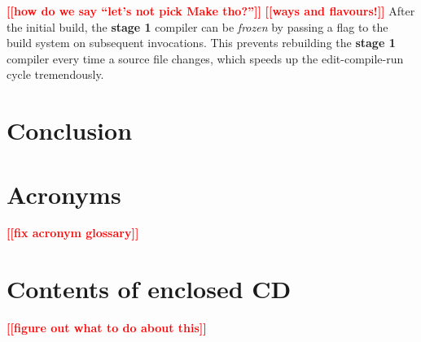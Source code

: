 \documentclass[thesis=B,english]{FITthesis}[2019/12/23]
\newcommand{\todo}[1]{\textcolor{red}{\textbf{[[#1]]}}}
\newcommand{\blind}[1][1]{\textcolor{gray}{\Blindtext[#1][1]}}
\begin{document}
\todo{how do we say ``let's not pick Make tho?''}
\todo{ways and flavours!}
After the initial build, the \textbf{stage 1} compiler can be \textit{frozen}
by passing a flag to the build system on subsequent invocations. This prevents
rebuilding the \textbf{stage 1} compiler every time a source file changes, which
speeds up the edit-compile-run cycle tremendously.

\blind[3]




\chapter{Conclusion}

\blind[2]




\appendix

\chapter{Acronyms}

\todo{fix acronym glossary}
\printglossary[type=\acronymtype]


\chapter{Contents of enclosed CD}

\todo{figure out what to do about this}

\begin{figure}
\end{figure}
\end{document}
